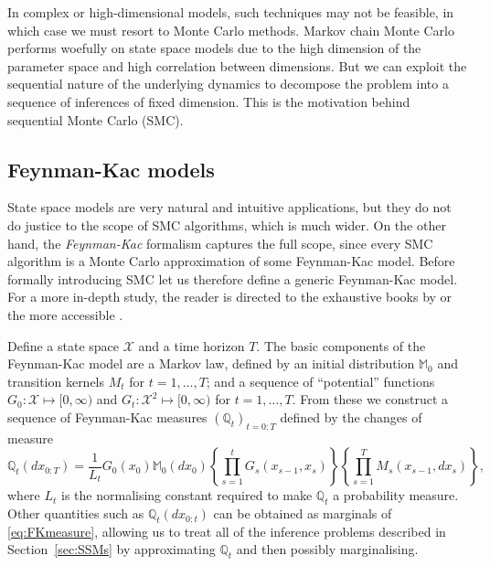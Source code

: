 In complex or high-dimensional models, such techniques may not be feasible, in which case we must resort to Monte Carlo methods.
Markov chain Monte Carlo performs woefully on state space models due to the high dimension of the parameter space and high correlation between dimensions. 
But we can exploit the sequential nature of the underlying dynamics to decompose the problem into a sequence of inferences of fixed dimension.
This is the motivation behind sequential Monte Carlo (SMC).


\subsection{Feynman-Kac models}
\label{sec:FKmodels}

State space models are very natural and intuitive applications, but they do not do justice to the scope of SMC algorithms, which is much wider.
On the other hand, the \emph{Feynman-Kac} formalism captures the full scope, since every SMC algorithm is a Monte Carlo approximation of some Feynman-Kac model.
Before formally introducing SMC let us therefore define a generic Feynman-Kac model.
For a more in-depth study, the reader is directed to the exhaustive books by \textcite{delmoral2004, delmoral2013} or the more accessible \textcite[Chapter 5]{chopin2020}.

Define a state space $\mathcal{X}$ and a time horizon $T$.
The basic components of the Feynman-Kac model are a Markov law, defined by an initial distribution $\mathbb{M}_0$ and transition kernels $M_t$ for $t=1,\dots,T$; and a sequence of ``potential'' functions $G_0 : \mathcal{X} \mapsto [0,\infty)$  and $G_t : \mathcal{X}^2 \mapsto [0,\infty)$ for $t=1,\dots,T$.
From these we construct a sequence of Feynman-Kac measures $(\mathbb{Q}_t)_{t=0:T}$ defined by the changes of measure
\begin{equation}
\mathbb{Q}_t (dx_{0:T}) = \frac{1}{L_t} G_0(x_0) \mathbb{M}_0(dx_0)
        \left\{ \prod_{s=1}^t G_s(x_{s-1}, x_s) \right\} 
        \left\{ \prod_{s=1}^T M_s(x_{s-1}, dx_s) \right\} , \label{eq:FKmeasure}
\end{equation}
where $L_t$ is the normalising constant required to make $\mathbb{Q}_t$ a probability measure. Other quantities such as $\mathbb{Q}_t (dx_{0:t})$ can be obtained as marginals of \eqref{eq:FKmeasure}, allowing us to treat all of the inference problems described in Section~\ref{sec:SSMs} by approximating $\mathbb{Q}_t$ and then possibly marginalising.

